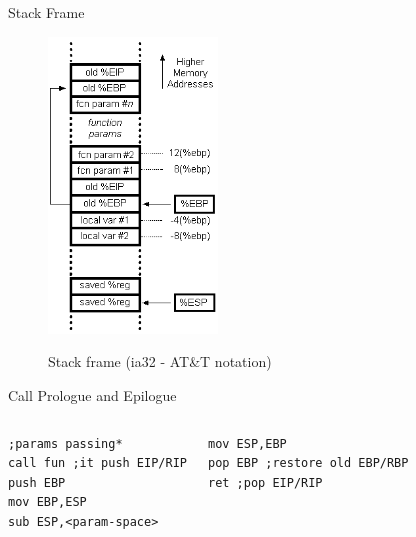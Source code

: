 \begin{frame}{Stack Frame}
\framebreak

	\begin{figure}
        \includegraphics[width=0.4\textwidth]{imgs/stackframe.png}
        \label{fig:stackframe}
        \caption{Stack frame (ia32 - AT\&T notation)}
    \end{figure}	

\framebreak

\begin{block}{Call Prologue and Epilogue}
\begin{columns}[c] 
    \acode
    \tiny
\begin{lstlisting}
;params passing*
call fun ;it push EIP/RIP
push EBP
mov EBP,ESP
sub ESP,<param-space>
\end{lstlisting}
     \acode
     \tiny
\begin{lstlisting}
mov ESP,EBP
pop EBP ;restore old EBP/RBP
ret ;pop EIP/RIP

\end{lstlisting}
\end{columns}
\end{block}


\end{frame}
